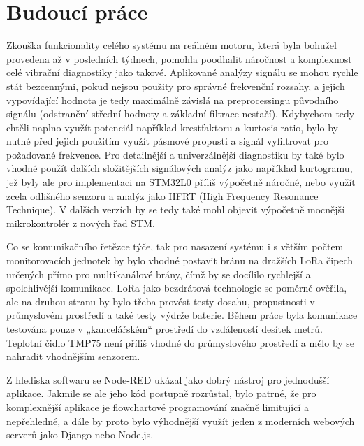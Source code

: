 \section{Budoucí práce}
    Zkouška funkcionality celého systému na reálném motoru, která byla bohužel provedena až v posledních týdnech, pomohla poodhalit náročnost a komplexnost celé vibrační diagnostiky jako takové. Aplikované analýzy signálu se mohou rychle stát bezcennými, pokud nejsou použity pro správné frekvenční rozsahy, a jejich vypovídající hodnota je tedy maximálně závislá na preprocessingu původního signálu (odstranění střední hodnoty a základní filtrace nestačí). Kdybychom tedy chtěli naplno využít potenciál například krestfaktoru a kurtosis ratio, bylo by nutné před jejich použitím využít pásmové propusti a signál vyfiltrovat pro požadované frekvence. Pro detailnější a univerzálnější diagnostiku by také bylo vhodné použít dalších složitějších signálových analýz jako například kurtogramu, jež byly ale pro implementaci na STM32L0 příliš výpočetně náročné, nebo využít zcela odlišného senzoru a analýz jako HFRT (High Frequency Resonance Technique). V dalších verzích by se tedy také mohl objevit výpočetně mocnější mikrokontrolér z nových řad STM.
        
    Co se komunikačního řetězce týče, tak pro nasazení systému i s větším počtem monitorovacích jednotek by bylo vhodné postavit bránu na dražších LoRa čipech určených přímo pro multikanálové brány, čímž by se docílilo rychlejší a spolehlivější komunikace. LoRa jako bezdrátová technologie se poměrně ověřila, ale na druhou stranu by bylo třeba provést testy dosahu, propustnosti v průmyslovém prostředí a také testy výdrže baterie. Během práce byla komunikace testována pouze v „kancelářském“ prostředí do vzdáleností desítek metrů.\\
    Teplotní čidlo TMP75 není příliš vhodné do průmyslového prostředí a mělo by se nahradit vhodnějším senzorem.
    
    Z hlediska softwaru se Node-RED ukázal jako dobrý nástroj pro jednodušší aplikace. Jakmile se ale jeho kód postupně rozrůstal, bylo patrné, že pro komplexnější aplikace je flowchartové programování značně limitující a nepřehledné, a dále by proto bylo výhodnější využít jeden z moderních webových serverů jako Django nebo Node.js.     
        